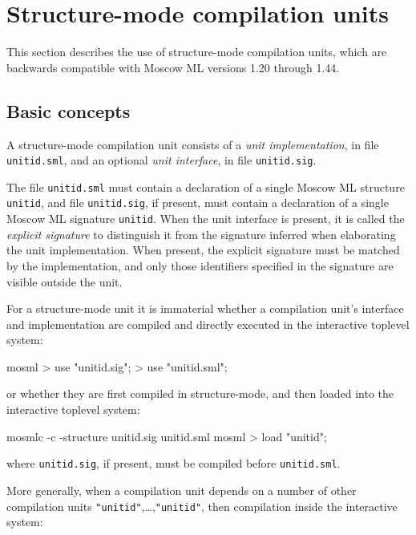 \documentclass[fleqn,a4paper]{article}
\begin{document}
\newpage
\section{Structure-mode compilation units}
\label{sec-structure-mode}

This section describes the use of structure-mode compilation units,
which are backwards compatible with Moscow ML versions 1.20 through
1.44.


\subsection{Basic concepts}

A structure-mode compilation unit consists of a {\em unit
  implementation}, in file \texttt{unitid.sml}, and an optional {\em
  unit interface}, in file \texttt{unitid.sig}\@.  

The file \texttt{unitid.sml} must contain a declaration of a single
Moscow ML structure \texttt{unitid}, and file \texttt{unitid.sig}, if
present, must contain a declaration of a single Moscow ML signature
\texttt{unitid}.  When the unit interface is present, it is called the
{\em explicit signature\/} to distinguish it from the signature
inferred when elaborating the unit implementation.  When present, the
explicit signature must be matched by the implementation, and only
those identifiers specified in the signature are visible outside the
unit.

For a structure-mode unit it is immaterial whether a compilation
unit's interface and implementation are compiled and directly executed
in the interactive toplevel system:

\begin{program}
mosml
> use "unitid.sig";
> use "unitid.sml";
\end{program}

\noindent 
or whether they are first compiled in structure-mode, and then loaded
into the interactive toplevel system:

\begin{program}
mosmlc -c -structure unitid.sig unitid.sml 
mosml
> load "unitid";
\end{program}

\noindent where \texttt{unitid.sig}, if present, must be compiled
before \texttt{unitid.sml}.

More generally, when a compilation unit depends on a number of other
compilation units \texttt{"unitid\et"},\ldots,\texttt{"unitid\n"},
then compilation inside the interactive system:
\end{document}

